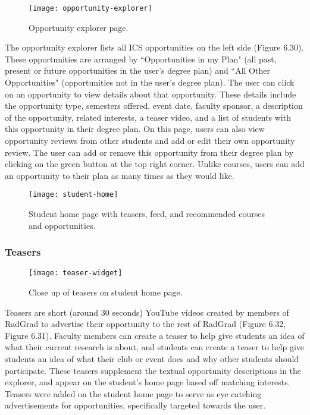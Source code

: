 \begin{figure}[htbp!]
\centering
\texttt{[image: opportunity-explorer]}
\caption{Opportunity explorer page.}
\end{figure}

The opportunity explorer lists all ICS opportunities on the left side (Figure 6.30). These opportunities are arranged by ``Opportunities in my Plan" (all past, present or future opportunities in the user's degree plan) and ``All Other Opportunities" (opportunities not in the user's degree plan). The user can click on an opportunity to view details about that opportunity. These details include the opportunity type, semesters offered, event date, faculty sponsor, a description of the opportunity, related interests, a teaser video, and a list of students with this opportunity in their degree plan. On this page, users can also view opportunity reviews from other students and add or edit their own opportunity review. The user can add or remove this opportunity from their degree plan by clicking on the green button at the top right corner. Unlike courses, users can add an opportunity to their plan as many times as they would like.

\begin{figure}[htbp!]
\centering
\texttt{[image: student-home]}
\caption{Student home page with teasers, feed, and recommended courses and opportunities.}
\end{figure}

\subsubsection{Teasers}
\begin{figure}[htbp!]
\centering
\texttt{[image: teaser-widget]}
\caption{Close up of teasers on student home page.}
\end{figure}
Teasers are short (around 30 seconds) YouTube videos created by members of RadGrad to advertise their opportunity to the rest of RadGrad (Figure 6.32, Figure 6.31). Faculty members can create a teaser to help give students an idea of what their current research is about, and students can create a teaser to help give students an idea of what their club or event does and why other students should participate. These teasers supplement the textual opportunity descriptions in the explorer, and appear on the student's home page based off matching interests. Teasers were added on the student home page to serve as eye catching advertisements for opportunities, specifically targeted towards the user.

